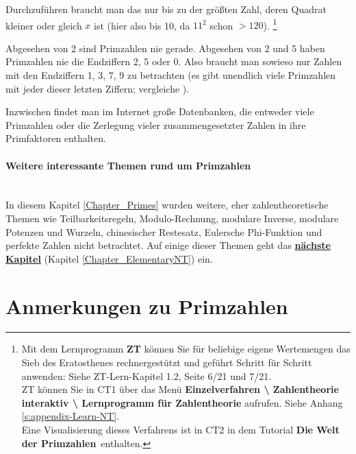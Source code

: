 \begin{refsegment}
Durchzuführen braucht man das nur bis zu der größten Zahl,
deren Quadrat kleiner oder gleich $x$ ist (hier also bis 10, da $11^2$ schon $> 120$).%
\footnote{%
%
%
Mit dem Lernprogramm \textbf{ZT} können Sie für beliebige eigene Wertemengen
das Sieb des Eratosthenes rechnergestützt und geführt Schritt für
Schritt anwenden: Siehe ZT-Lern-Kapitel 1.2, Seite 6/21 und 7/21.\\
ZT können Sie in CT1 über das Menü
\textbf{Einzelverfahren \textbackslash{} Zahlentheorie interaktiv \textbackslash{}
Lernprogramm für Zahlentheorie} aufrufen.
    Siehe Anhang \ref{s:appendix-Learn-NT}.\\
    Eine Visualisierung dieses Verfahrens ist in CT2
    in dem Tutorial \textbf{\glqq Die Welt der Primzahlen\grqq}~enthalten.
}


Abgesehen von 2 sind Primzahlen nie gerade. Abgesehen von 2 und 5 haben Primzahlen nie die
Endziffern 2, 5 oder 0. Also braucht man sowieso nur Zahlen mit den Endziffern 1, 3, 7, 9 zu
betrachten (es gibt unendlich viele Primzahlen mit jeder dieser letzten Ziffern; vergleiche
\cite[Bd. 1, S. 137]{Tietze1973}).

Inzwischen findet man im Internet große Datenbanken, die entweder viele
Primzahlen oder die Zerlegung vieler zusammengesetzter Zahlen
in ihre Primfaktoren enthalten.


\paragraph*{Weitere interessante Themen rund um Primzahlen} \mbox{}\\
In diesem Kapitel \ref{Chapter_Primes} wurden weitere, eher zahlentheoretische
Themen wie Teilbarkeitsregeln, Modulo-Rechnung, modulare Inverse, modulare Potenzen
und Wurzeln, chinesischer Restesatz, Eulersche Phi-Funktion und perfekte Zahlen
nicht betrachtet. Auf einige dieser Themen geht das \hyperlink{Chapter_ElementaryNT}
{\textbf{nächste Kapitel}} (Kapitel \ref{Chapter_ElementaryNT}) ein.



\pagebreak
\hypertarget{h_Notes-about-primes}{}
\section{Anmerkungen zu Primzahlen}
\label{l_Notes-about-primes}


\end{refsegment}
